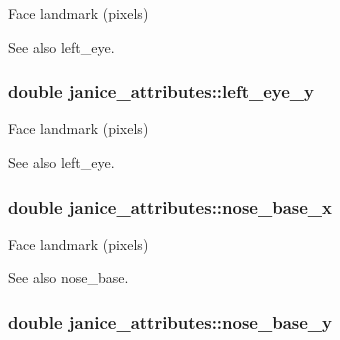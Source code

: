 Face landmark (pixels) 

\begin{DoxySeeAlso}{See also}
left\+\_\+eye. 
\end{DoxySeeAlso}
\hypertarget{structjanice__attributes_abfb4ea4edbb6530d890c3f6abe0bd272}{}
\subsubsection[{left\+\_\+eye\+\_\+y}]{\setlength{\rightskip}{0pt plus 5cm}double janice\+\_\+attributes\+::left\+\_\+eye\+\_\+y}\label{structjanice__attributes_abfb4ea4edbb6530d890c3f6abe0bd272}


Face landmark (pixels) 

\begin{DoxySeeAlso}{See also}
left\+\_\+eye. 
\end{DoxySeeAlso}
\hypertarget{structjanice__attributes_a5fcf5e4cc1b7ff175ca9dd067b845f7c}{}
\subsubsection[{nose\+\_\+base\+\_\+x}]{\setlength{\rightskip}{0pt plus 5cm}double janice\+\_\+attributes\+::nose\+\_\+base\+\_\+x}\label{structjanice__attributes_a5fcf5e4cc1b7ff175ca9dd067b845f7c}


Face landmark (pixels) 

\begin{DoxySeeAlso}{See also}
nose\+\_\+base. 
\end{DoxySeeAlso}
\hypertarget{structjanice__attributes_afe1b9645e0d65b7a599931b3a887dce3}{}
\subsubsection[{nose\+\_\+base\+\_\+y}]{\setlength{\rightskip}{0pt plus 5cm}double janice\+\_\+attributes\+::nose\+\_\+base\+\_\+y}\label{structjanice__attributes_afe1b9645e0d65b7a599931b3a887dce3}


